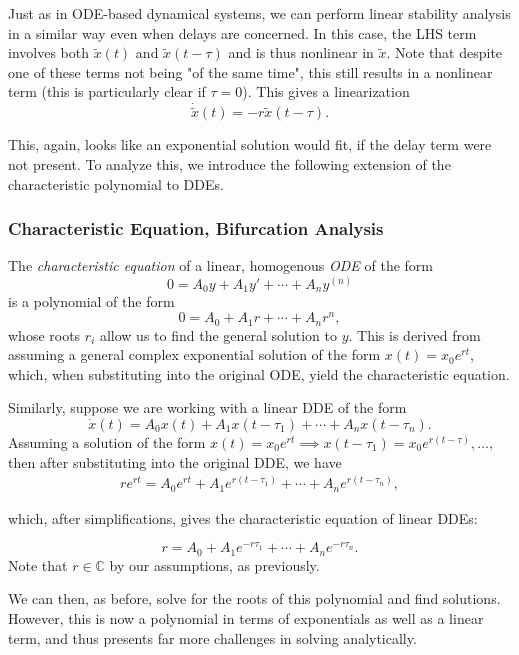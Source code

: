 \documentclass[12pt]{article}
\begin{document}
Just as in ODE-based dynamical systems, we can perform linear stability analysis in a similar way even when delays are concerned. In this case, the LHS term involves both $\tilde{x}(t)$ and $\tilde{x}(t - \tau)$ and is thus nonlinear in $\tilde{x}$. Note that despite one of these terms not being "of the same time", this still results in a nonlinear term (this is particularly clear if $\tau = 0$). This gives a linearization \begin{equation}\label{eqn:linearization}
    \dot{\tilde{x}}(t) = -r \tilde{x}(t - \tau).
\end{equation}

This, again, looks like an exponential solution would fit, if the delay term were not present. To analyze this, we introduce the following extension of the characteristic polynomial to DDEs.

\subsubsection{Characteristic Equation, Bifurcation Analysis}

The \emph{characteristic equation} of a linear, homogenous \textit{ODE} of the form \[
0 = A_0y + A_1y' + \cdots + A_ny^{(n)}
\]
is a polynomial of the form \[
0 = A_0 + A_1r + \cdots + A_n r^n,
\]
whose roots $r_i$ allow us to find the general solution to $y$. This is derived from assuming a general complex exponential solution of the form $x(t) = x_0 e^{rt}$, which, when substituting into the original ODE, yield the characteristic equation.

Similarly, suppose we are working with a linear DDE of the form \[
\dot{x}(t) = A_0 x(t) + A_1x(t -\tau_1) + \cdots + A_n x(t - \tau_n).
\]
Assuming a solution of the form $x(t) = x_0e^{rt} \implies x(t - \tau_1) = x_0e^{r(t - \tau)}, \dots,$ then after substituting into the original DDE, we have \begin{align}
    re^{rt} = A_0e^{rt} + A_1e^{r(t - \tau_1)} + \cdots + A_n e^{r(t - \tau_n)},
\end{align}

which, after simplifications, gives the characteristic equation of linear DDEs:

\begin{equation}\label{eqn:characteristic}
    r = A_0 + A_1e^{-r\tau_1} + \cdots + A_ne^{-r\tau_n}.
\end{equation}
Note that $r \in \mathbb{C}$ by our assumptions, as previously.

We can then, as before, solve for the roots of this polynomial and find solutions. However, this is now a polynomial in terms of exponentials as well as a linear term, and thus presents far more challenges in solving analytically.
\end{document}
